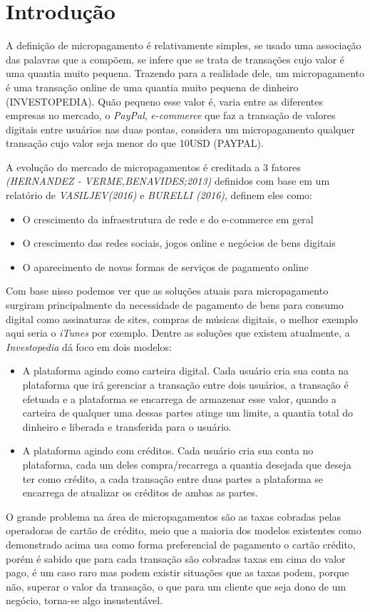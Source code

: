 \documentclass[hidelinks,12pt]{article}
\begin{document}
\section{Introdu\c{c}\~ao}
A defini\c{c}\~ao de micropagamento \'e relativamente simples, se usado uma associa\c{c}\~ao das palavras que a comp\~oem, se infere que se trata de transa\c{c}\~oes cujo valor \'e uma quantia muito pequena. Trazendo para a realidade dele, um micropagamento \'e uma transa\c{c}\~ao online de uma quantia muito pequena de dinheiro (INVESTOPEDIA). Qu\~ao pequeno esse valor \'e, varia entre as diferentes empresas no mercado, o \textit{PayPal}, \textit{e-commerce} que faz a transa\c{c}\~ao de valores digitais entre usu\'arios nas duas pontas, considera um micropagamento qualquer transa\c{c}\~ao cujo valor seja menor do que 10USD (PAYPAL).

A evolu\c{c}\~ao do mercado de  micropagamentos \'e creditada a 3 fatores \textit{(HERNANDEZ - VERME,BENAVIDES;2013)} definidos com base em um relat\'orio de \textit{VASILJEV(2016)} e \textit{BURELLI (2016)}, definem eles como: 
\begin{itemize}
	\item O crescimento da infraestrutura de rede e do e-commerce em geral
	\item O crescimento das redes sociais, jogos online e neg\'ocios de bens digitais
	\item O aparecimento de novas formas de servi\c{c}os de pagamento online
\end{itemize}
Com base nisso podemos ver que as solu\c{c}\~oes atuais para micropagamento surgiram principalmente da necessidade de pagamento de bens para consumo digital como assinaturas de sites, compras de m\'usicas digitais, o melhor exemplo aqui seria o \textit{iTunes} por exemplo.
Dentre as solu\c{c}\~oes que existem atualmente, a \textit{Investopedia} d\'a foco em dois modelos:
\begin{itemize}
	\item A plataforma agindo como carteira digital. Cada usu\'ario cria sua conta na plataforma que ir\'a gerenciar a transa\c{c}\~ao entre dois usu\'arios, a transa\c{c}\~ao \'e efetuada e a plataforma se encarrega de armazenar esse valor, quando a carteira de qualquer uma dessas partes atinge um limite, a quantia total do dinheiro e liberada e transferida para o usu\'ario.
	\item A plataforma agindo com cr\'editos. Cada usu\'ario cria sua conta no plataforma, cada um deles compra/recarrega a quantia desejada que deseja ter como cr\'edito, a cada transa\c{c}\~ao entre duas partes a plataforma se encarrega de atualizar os cr\'editos de ambas as partes.
\end{itemize}
O grande problema na \'area de micropagamentos s\~ao as taxas cobradas pelas operadoras de cart\~ao de cr\'edito, meio que a maioria dos modelos existentes como demonstrado acima usa como forma preferencial de pagamento o cart\~ao cr\'edito, por\'em \'e sabido que para cada transa\c{c}\~ao s\~ao cobradas taxas em cima do valor pago, \'e um caso raro mas podem existir situa\c{c}\~oes que as taxas podem, porque n\~ao, superar o valor da transa\c{c}\~ao, o que para um cliente que seja dono de um neg\'ocio, torna-se algo insustent\'avel.
\end{document}
